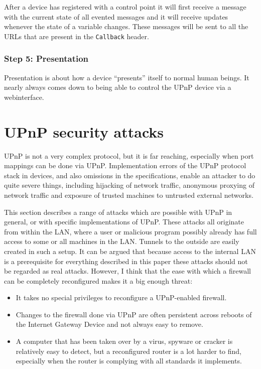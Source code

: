 \documentclass[10pt]{article}
\begin{document}
After a device has registered with a control point it will first receive
a message with the current state of all evented messages and it will receive
updates whenever the state of a variable changes. These messages will be
sent to all the URLs that are present in the \texttt{Callback} header.

\subsubsection{Step 5: Presentation}

Presentation is about how a device ``presents'' itself to normal human beings.
It nearly always comes down to being able to control the UPnP device via a
webinterface.


\section{UPnP security attacks}

UPnP is not a very complex protocol, but it is far reaching, especially when
port mappings can be done via UPnP. Implementation errors of the UPnP protocol
stack in devices, and also omissions in the specifications, enable an attacker
to do quite severe things, including hijacking of network traffic, anonymous
proxying of network traffic and exposure of trusted machines to untrusted
external networks.

This section describes a range of attacks which are possible with UPnP in
general, or with specific implementations of UPnP. These attacks all originate
from within the LAN, where a user or malicious program possibly already has
full access to some or all machines in the LAN. Tunnels to the outside are
easily created in such a setup. It can be argued that because access to the
internal LAN is a prerequisite for everything described in this paper these
attacks should not be regarded as real attacks. However, I think that the
ease with which a firewall can be completely reconfigured makes it a big
enough threat:

\begin{itemize}
\item It takes no special privileges to reconfigure a UPnP-enabled firewall.
\item Changes to the firewall done via UPnP are often persistent across
reboots of the Internet Gateway Device and not always easy to remove.
\item A computer that has been taken over by a virus, spyware or cracker is
relatively easy to detect, but a reconfigured router is a lot harder to find,
especially when the router is complying with all standards it implements.
\end{itemize}
\end{document}
